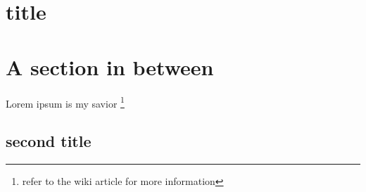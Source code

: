 \documentclass{article}
\begin{document}
	\section{title}
	\lipsum[1-2]
	\pagebreak	
	\section{A section in between}
	\lipsum[1-2]
	Lorem ipsum is my savior
	\footnote{refer to the wiki article for more information}
	\begin{landscape}
	\section{second title}
	\lipsum[1-2]	
	\end{landscape}

	
	\lipsum[1-10]
\end{document}
